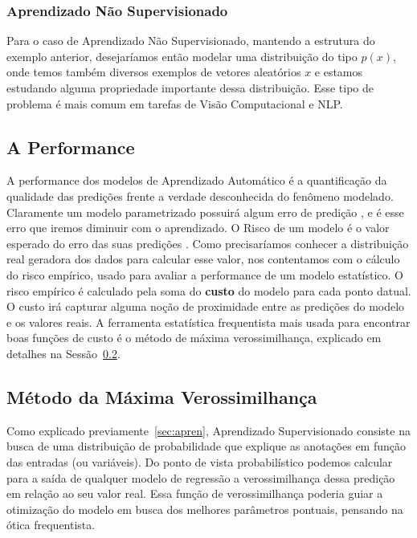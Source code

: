 \subsubsection{Aprendizado Não Supervisionado}

Para o caso de Aprendizado Não Supervisionado, mantendo a estrutura do exemplo
anterior, desejaríamos então modelar uma distribuição do tipo $p(x)$, onde temos
também diversos exemplos de vetores aleatórios $x$ e estamos estudando alguma
propriedade importante dessa distribuição.
Esse tipo de problema é mais comum em tarefas de Visão Computacional e NLP.



\subsection{A Performance}
\label{sec:metricas}

A performance dos modelos de Aprendizado Automático é a quantificação da
qualidade das predições frente a verdade desconhecida do fenômeno modelado.
Claramente um modelo parametrizado possuirá algum erro de predição \citep{dlbook}, e é esse
erro que iremos diminuir com o aprendizado. O Risco de um modelo é o valor esperado do erro das suas predições \citep{mlprob}. Como precisaríamos conhecer a distribuição real geradora dos dados para calcular esse valor, nos contentamos com o cálculo do risco empírico, usado para avaliar a performance de um modelo estatístico. O risco empírico é calculado pela soma do \textbf{custo} do modelo para cada ponto datual. O custo irá capturar alguma noção de proximidade entre as predições do modelo e os valores reais. A ferramenta estatística frequentista mais usada para encontrar boas funções de custo é o método de máxima verossimilhança, explicado em detalhes na Sessão~\ref{sec:est}. 


\subsection{Método da Máxima Verossimilhança}
\label{sec:est}


Como explicado previamente~\ref{sec:apren}, Aprendizado Supervisionado consiste na busca de uma distribuição de probabilidade que explique as anotações em função das entradas (ou variáveis). Do ponto de vista probabilístico podemos calcular para a saída de qualquer modelo de regressão a verossimilhança dessa predição em relação ao seu valor real. Essa função de verossimilhança poderia guiar a otimização do modelo em busca dos melhores parâmetros pontuais, pensando na ótica frequentista. 

